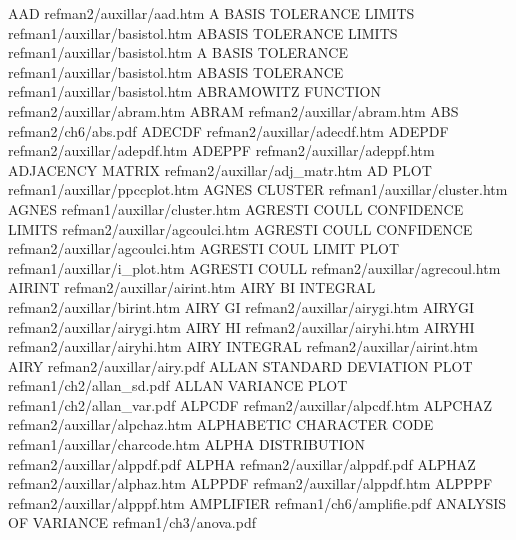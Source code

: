 AAD                                     refman2/auxillar/aad.htm
A BASIS TOLERANCE LIMITS                refman1/auxillar/basistol.htm
ABASIS TOLERANCE LIMITS                 refman1/auxillar/basistol.htm
A BASIS TOLERANCE                       refman1/auxillar/basistol.htm
ABASIS TOLERANCE                        refman1/auxillar/basistol.htm
ABRAMOWITZ FUNCTION                     refman2/auxillar/abram.htm
ABRAM                                   refman2/auxillar/abram.htm
ABS                                     refman2/ch6/abs.pdf
ADECDF                                  refman2/auxillar/adecdf.htm
ADEPDF                                  refman2/auxillar/adepdf.htm
ADEPPF                                  refman2/auxillar/adeppf.htm
ADJACENCY MATRIX                        refman2/auxillar/adj_matr.htm
AD PLOT                                 refman1/auxillar/ppccplot.htm
AGNES CLUSTER                           refman1/auxillar/cluster.htm
AGNES                                   refman1/auxillar/cluster.htm
AGRESTI COULL CONFIDENCE LIMITS         refman2/auxillar/agcoulci.htm
AGRESTI COULL CONFIDENCE                refman2/auxillar/agcoulci.htm
AGRESTI COUL LIMIT PLOT                 refman1/auxillar/i_plot.htm
AGRESTI COULL                           refman2/auxillar/agrecoul.htm
AIRINT                                  refman2/auxillar/airint.htm
AIRY BI INTEGRAL                        refman2/auxillar/birint.htm
AIRY GI                                 refman2/auxillar/airygi.htm
AIRYGI                                  refman2/auxillar/airygi.htm
AIRY HI                                 refman2/auxillar/airyhi.htm
AIRYHI                                  refman2/auxillar/airyhi.htm
AIRY INTEGRAL                           refman2/auxillar/airint.htm
AIRY                                    refman2/auxillar/airy.pdf
ALLAN STANDARD DEVIATION PLOT           refman1/ch2/allan_sd.pdf
ALLAN VARIANCE PLOT                     refman1/ch2/allan_var.pdf
ALPCDF                                  refman2/auxillar/alpcdf.htm
ALPCHAZ                                 refman2/auxillar/alpchaz.htm
ALPHABETIC CHARACTER CODE               refman1/auxillar/charcode.htm
ALPHA DISTRIBUTION                      refman2/auxillar/alppdf.pdf
ALPHA                                   refman2/auxillar/alppdf.pdf
ALPHAZ                                  refman2/auxillar/alphaz.htm
ALPPDF                                  refman2/auxillar/alppdf.htm
ALPPPF                                  refman2/auxillar/alpppf.htm
AMPLIFIER                               refman1/ch6/amplifie.pdf
ANALYSIS OF VARIANCE                    refman1/ch3/anova.pdf
